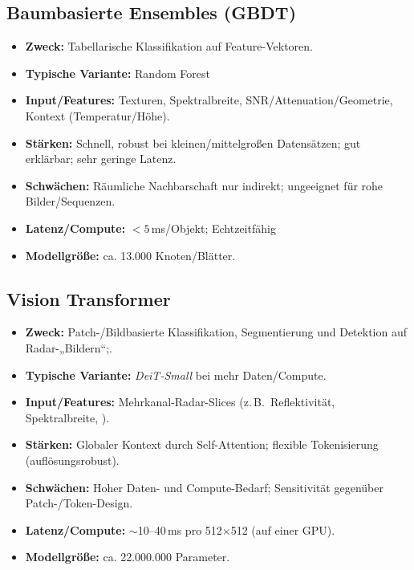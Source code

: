\subsection*{Baumbasierte Ensembles (GBDT)}
\begin{itemize}
  \item \textbf{Zweck:} Tabellarische Klassifikation auf Feature-Vektoren.
  \item \textbf{Typische Variante:} Random Forest
  \item \textbf{Input/Features:} Texturen, Spektralbreite, SNR/Attenuation/Geometrie, Kontext (Temperatur/Höhe).
  \item \textbf{Stärken:} Schnell, robust bei kleinen/mittelgroßen Datensätzen; gut erklärbar; sehr geringe Latenz.
  \item \textbf{Schwächen:} Räumliche Nachbarschaft nur indirekt; ungeeignet für rohe Bilder/Sequenzen.
  \item \textbf{Latenz/Compute:} $< 5$\,ms/Objekt; Echtzeitfähig
  \item \textbf{Modellgröße:} ca. 13.000 Knoten/Blätter.
\end{itemize}

\subsection*{Vision Transformer}

\begin{itemize}
  \item \textbf{Zweck:} Patch-/Bildbasierte Klassifikation, Segmentierung und Detektion auf Radar-„Bildern“;.
  \item \textbf{Typische Variante:} \emph{DeiT-Small} bei mehr Daten/Compute.
  \item \textbf{Input/Features:} Mehrkanal-Radar-Slices (z.\,B.\ Reflektivität, Spektralbreite, ).
  \item \textbf{Stärken:} Globaler Kontext durch Self-Attention; flexible Tokenisierung (auflösungsrobust).
  \item \textbf{Schwächen:} Hoher Daten- und Compute-Bedarf; Sensitivität gegenüber Patch-/Token-Design.
  \item \textbf{Latenz/Compute:}  $\sim$10--40\,ms pro 512$\times$512 (auf einer GPU).
  \item \textbf{Modellgröße:} ca. 22.000.000 Parameter.
\end{itemize}


